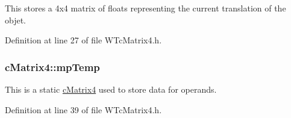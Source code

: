This stores a 4x4 matrix of floats representing the current translation of the objet. 



Definition at line 27 of file WTcMatrix4.h.

\hypertarget{classc_matrix4_a93af3ea9ca6f3d38ad65b8ebc75ed7ba}{
\subsubsection[{mpTemp}]{ {\bf cMatrix4::mpTemp}}}
\label{classc_matrix4_a93af3ea9ca6f3d38ad65b8ebc75ed7ba}


This is a static \hyperlink{classc_matrix4}{cMatrix4} used to store data for operands. 



Definition at line 39 of file WTcMatrix4.h.

